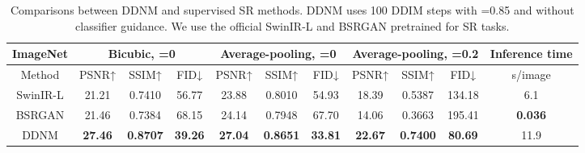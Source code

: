 \documentclass{article} \usepackage{iclr2023_conference,times}
\begin{document}
\begin{table*}[h]
\scriptsize
\centering
    \begin{tabular}{c | ccc | ccc| ccc|c}
    \hline
           \multicolumn{1}{c}{\rule{0pt}{8pt}\tiny\textbf{ImageNet}}&\multicolumn{3}{|c}{Bicubic, =0} &\multicolumn{3}{|c}{Average-pooling, =0}&\multicolumn{3}{|c}{Average-pooling, =0.2}&\multicolumn{1}{|c}{Inference time}\\
        \hline
           \rule{0pt}{8pt}Method& PSNR↑&SSIM↑&FID↓ & PSNR↑&SSIM↑&FID↓ & PSNR↑&SSIM↑&FID↓&s/image \\
        \hline
            \rule{0pt}{8pt}{SwinIR-L} &21.21&0.7410&56.77 &23.88&0.8010&54.93 &18.39&0.5387&134.18&6.1\\
            \rule{0pt}{8pt}{BSRGAN} &21.46&0.7384&68.15 &24.14&0.7948&67.70 &14.06&0.3663&195.41&\textbf{0.036}\\
            \rule{0pt}{8pt}{DDNM} & \textbf{27.46}&\textbf{0.8707}&\textbf{39.26}& \textbf{27.04}&\textbf{0.8651}&\textbf{33.81}& \textbf{22.67}&\textbf{0.7400}&\textbf{80.69}&11.9\\
        \hline
    \end{tabular}
    \caption{Comparisons between DDNM and supervised SR methods. DDNM uses 100 DDIM steps with =0.85 and without classifier guidance. We use the official SwinIR-L \citep{liang2021swinir} and BSRGAN \citep{zhang2021designing} pretrained for SR tasks.}
    \label{tb:ddnm supervised}
    \vspace{-0.5cm}
\end{table*}
\newpage
\end{document}
